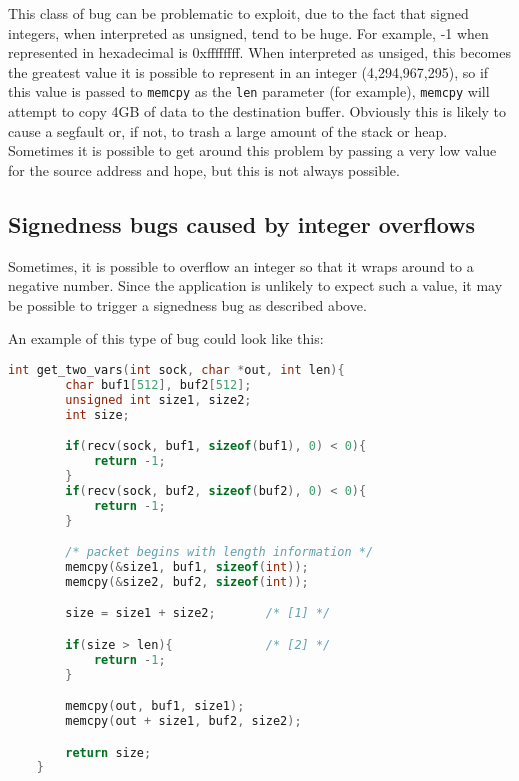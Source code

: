 \documentclass{iacrtrans}
\begin{document}
This class of bug can be problematic to exploit, due to the fact that
signed integers, when interpreted as unsigned, tend to be huge.  For
example, -1 when represented in hexadecimal is 0xffffffff.  When
interpreted as unsiged, this becomes the greatest value it is possible to
represent in an integer (4,294,967,295), so if this value is passed to
\texttt{memcpy} as the \texttt{len} parameter (for example), \texttt{memcpy} will attempt to copy 4GB
of data to the destination buffer.  Obviously this is likely to cause a
segfault or, if not, to trash a large amount of the stack or heap.
Sometimes it is possible to get around this problem by passing a very low
value for the source address and hope, but this is not always possible.



\subsection{Signedness bugs caused by integer overflows}

Sometimes, it is possible to overflow an integer so that it wraps around to
a negative number.  Since the application is unlikely to expect such a
value, it may be possible to trigger a signedness bug as described above.

An example of this type of bug could look like this:

\begin{lstlisting}[language=c]
    int get_two_vars(int sock, char *out, int len){
        char buf1[512], buf2[512];
        unsigned int size1, size2;
        int size;

        if(recv(sock, buf1, sizeof(buf1), 0) < 0){
            return -1;
        }
        if(recv(sock, buf2, sizeof(buf2), 0) < 0){
            return -1;
        }

        /* packet begins with length information */
        memcpy(&size1, buf1, sizeof(int));
        memcpy(&size2, buf2, sizeof(int));

        size = size1 + size2;       /* [1] */

        if(size > len){             /* [2] */
            return -1;
        }

        memcpy(out, buf1, size1);
        memcpy(out + size1, buf2, size2);

        return size;
    }
\end{lstlisting}
\end{document}
